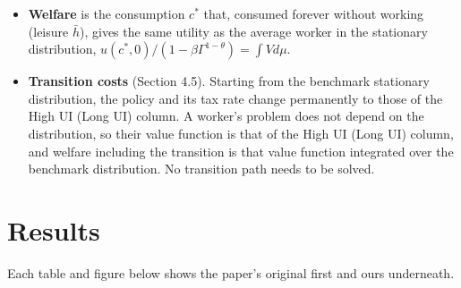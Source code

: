 \documentclass[11pt,fleqn]{article}
\begin{document}
\begin{itemize}
 \item \textbf{Welfare} is the consumption $c^*$ that, consumed forever without working (leisure $\bar{h}$), gives the same utility as the average worker in the stationary distribution, $u(c^*,0)/(1-\beta\Gamma^{1-\theta}) = \int V d\mu$.
 \item \textbf{Transition costs} (Section 4.5). Starting from the benchmark stationary distribution, the policy and its tax rate change permanently to those of the High UI (Long UI) column. A worker's problem does not depend on the distribution, so their value function is that of the High UI (Long UI) column, and welfare including the transition is that value function integrated over the benchmark distribution. No transition path needs to be solved.
\end{itemize}


\section{Results}
\label{sec:results}

Each table and figure below shows the paper's original first and ours underneath.
\end{document}
